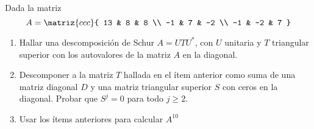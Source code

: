 \begin{enunciado}{\ejercicio}
  Dada la matriz
  $$
    A =
    \matriz{ccc}{
      13 & 8 & 8 \\
      -1 & 7 & -2 \\
      -1 & -2 & 7
    }
  $$
  \begin{enumerate}[label=(\alph*)]
    \item Hallar una descomposición de Schur $A = UTU^*$, con $U$ unitaria y $T$ triangular superior
          con los autovalores de la matriz $A$ en la diagonal.

    \item Descomponer a la matriz $T$ hallada en el ítem anterior como suma de una matriz diagonal $D$ y una matriz triangular
          superior $S$ con ceros en la diagonal. Probar que $S^j = 0$ para todo $j \geq 2$.

    \item Usar los ítems anteriores para calcular $A^{10}$
  \end{enumerate}
\end{enunciado}

